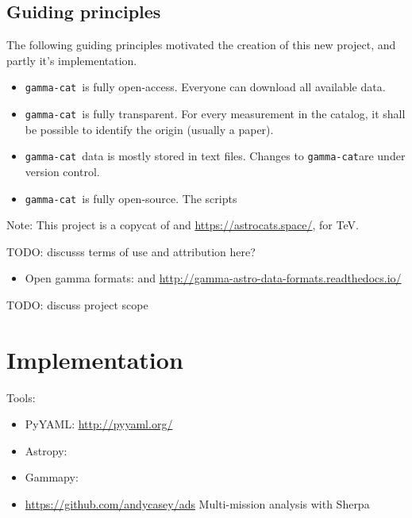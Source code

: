 \documentclass[11pt,twoside]{article}
\newcommand{\gammacat}{\texttt{gamma-cat}}
\begin{document}
\subsection{Guiding principles}

The following guiding principles motivated the creation of this new project, and partly it's implementation.

\begin{itemize}
\item \gammacat\ is fully open-access. Everyone can download all available data.
\item \gammacat\ is fully transparent. For every measurement in the catalog, it shall be possible to identify the origin (usually a paper).
\item \gammacat\ data is mostly stored in text files. Changes to \gammacat are under version control.
\item \gammacat\ is fully open-source. The scripts
\end{itemize}


Note: This project is a copycat of \citet{sne-cat} and \url{https://astrocats.space/}, for TeV.

TODO: discusss terms of use and attribution here?

\begin{itemize}
\item Open gamma formats: \citet{open-gamma} and \url{http://gamma-astro-data-formats.readthedocs.io/}
\end{itemize}

TODO: discuss project scope


\section{Implementation}

Tools:

\begin{itemize}
\item PyYAML: \url{http://pyyaml.org/}
\item Astropy: \citet{astropy}
\item Gammapy: \citet{gammapy}
\item \url{https://github.com/andycasey/ads}
Multi-mission analysis with Sherpa \citep{sherpa}
\end{itemize}
\end{document}
